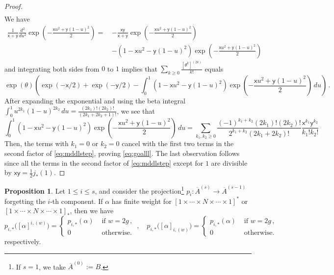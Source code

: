 \documentclass[11pt]{article}
\newcommand{\barA}{\overline{A}}
\theoremstyle{definition}
\newtheorem{proposition}[definition]{Proposition}
\begin{document}
\begin{proof}
\begin{align}
\end{align}
We have
\begin{align*}
\frac{1}{\mathsf{x}+\mathsf{y}}\frac{d^2}{du^2}\exp\left(-\frac{\mathsf{x}u^2+\mathsf{y}(1-u)^2}{2}\right)=\, &-\frac{\mathsf{x}\mathsf{y}}{\mathsf{x}+\mathsf{y}}\exp\left(-\frac{\mathsf{x}u^2+\mathsf{y}(1-u)^2}{2}\right)\\
&-\left(1-\mathsf{x}u^2-\mathsf{y}(1-u)^2\right)\exp\left(-\frac{\mathsf{x}u^2+\mathsf{y}(1-u)^2}{2}\right)
\end{align*}
and integrating both sides from $0$ to $1$ implies that $\sum_{k\geq 0}\frac{[\theta^k]^{(2k)}}{k!}$ equals
\begin{equation}\label{eq:mddlstep}
\exp(\theta)\left(\exp(-\mathsf{x}/2) + \exp(-\mathsf{y}/2) - \int_0^1\left(1-\mathsf{x}u^2-\mathsf{y}(1-u)^2\right)\exp\left(-\frac{\mathsf{x}u^2+\mathsf{y}(1-u)^2}{2}\right)\,du\right)\, .
\end{equation}
After expanding the exponential and using the beta integral $\int_0^1u^{2k_1}(1-u)^{2k_2}\,du=\frac{(2k_1)!(2k_2)!}{(2k_1+2k_2+1)!}$, we see that
$$
\int_0^1\left(1-\mathsf{x}u^2-\mathsf{y}(1-u)^2\right)\exp\left(-\frac{\mathsf{x}u^2+\mathsf{y}(1-u)^2}{2}\right)\,du=\sum_{k_1,k_2\geq0}\frac{(-1)^{k_1+k_2}(2k_1)!(2k_2)!}{2^{k_1+k_2}(2k_1+2k_2)!}\frac{\mathsf{x}^{k_1}\mathsf{y}^{k_2}}{k_1!k_2!}
$$
Then, the terms with $k_1=0$ or $k_2=0$ cancel with the first two terms in the second factor of \eqref{eq:mddlstep}, proving \eqref{eq:goalll}. The last observation follows since all the terms in the second factor of \eqref{eq:mddlstep} except for $1$ are divisible by $\mathsf{x}\mathsf{y} = \frac{1}{2}j_*(1)$.
\end{proof}

\begin{proposition}\label{pro:vanish}
    Let $1 \leq i \leq s$, and consider the projection\footnote{If $s=1$, we take $\barA^{(0)}:=B$.} $p_i : \barA^{(s)} \to \barA^{(s-1)}$ forgetting the $i$-th component. If $\alpha$ has finite weight for $[1 \times \cdots \times N\times \cdots \times 1]^*$ or $[1 \times \cdots \times N\times \cdots \times 1]_*$, then we have
    $$
    p_{i,*} \big([\alpha]^{i,(w)}\big) = \begin{cases}
        p_{i,*} (\alpha)&\text{ if }w = 2g\, ,\\
        0&\text{ otherwise.}
    \end{cases}\, ,\quad p_{i,*} \big([\alpha]_{i,(w)}\big) = \begin{cases}
        p_{i,*} (\alpha)&\text{ if }w = 2g\, ,\\
        0&\text{ otherwise.}
    \end{cases}
    $$
    respectively.
\end{proposition}
\end{document}
